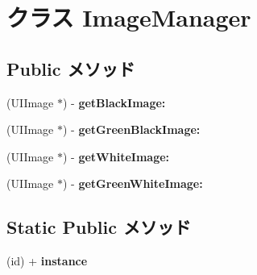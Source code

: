 \hypertarget{interface_image_manager}{
\section{クラス ImageManager}
\label{interface_image_manager}
}
\subsection*{Public メソッド}
\begin{DoxyCompactItemize}
\item 
\hypertarget{interface_image_manager_ab03bf41b90ab0416e15949a90068533f}{
(UIImage $\ast$) -\/ {\bfseries getBlackImage:}}
\label{interface_image_manager_ab03bf41b90ab0416e15949a90068533f}

\item 
\hypertarget{interface_image_manager_a822e853d301f90cc7382198cc2c4ea3a}{
(UIImage $\ast$) -\/ {\bfseries getGreenBlackImage:}}
\label{interface_image_manager_a822e853d301f90cc7382198cc2c4ea3a}

\item 
\hypertarget{interface_image_manager_a20779aa491f4089e6b8badb1947a2ebc}{
(UIImage $\ast$) -\/ {\bfseries getWhiteImage:}}
\label{interface_image_manager_a20779aa491f4089e6b8badb1947a2ebc}

\item 
\hypertarget{interface_image_manager_aa80cd9fb2fef506df8903ce3c268975b}{
(UIImage $\ast$) -\/ {\bfseries getGreenWhiteImage:}}
\label{interface_image_manager_aa80cd9fb2fef506df8903ce3c268975b}

\end{DoxyCompactItemize}
\subsection*{Static Public メソッド}
\begin{DoxyCompactItemize}
\item 
\hypertarget{interface_image_manager_a5524fef52e54362f9f29b2a33e79c529}{
(id) + {\bfseries instance}}
\label{interface_image_manager_a5524fef52e54362f9f29b2a33e79c529}

\end{DoxyCompactItemize}
